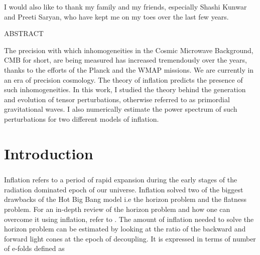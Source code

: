 \documentclass[12pt,a4paper,oneside]{book}
\begin{document}
I would also like to thank my family and my friends, especially Shashi Kunwar
and Preeti Saryan, who have kept me on my toes over the last few years.
 

\newpage\topskip 40pt
\thispagestyle{empty}
\centerline{\Large ABSTRACT}
\vskip 20pt\noindent 

The precision with which inhomogeneities in the Cosmic Microwave Background, CMB for short, are being measured
has increased tremendously over the years, thanks to the efforts of the Planck and the WMAP missions. 
We are currently in an era of precision cosmology. The theory of inflation predicts the presence of such 
inhomogeneities. In this work, I studied the theory behind the generation and evolution of tensor perturbations, 
otherwise referred to as primordial gravitational waves. I also numerically estimate the power spectrum of such 
perturbations for two different models of inflation.

\newpage
\thispagestyle{empty}
\tableofcontents
\newpage


\newpage
\thispagestyle{empty}
\listoffigures
\newpage




\chapter{Introduction}

\paragraph*{} Inflation refers to a period of rapid expansion during the early stages of the radiation dominated epoch of our universe. 
Inflation solved two of the biggest drawbacks of the Hot Big Bang model i.e the horizon problem and the flatness problem. For an in-depth 
review of the horizon problem and how one can overcome it using inflation, refer to %
. The amount of inflation 
needed to solve the horizon problem can be estimated by looking at the ratio of the backward and forward light cones at the epoch of 
decoupling. It is expressed in terms of number of e-folds defined as
\end{document}
